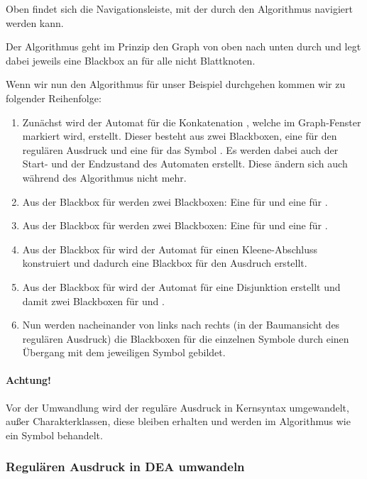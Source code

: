 Oben findet sich die Navigationsleiste, mit der durch den Algorithmus navigiert werden kann.

Der Algorithmus geht im Prinzip den Graph von oben nach unten durch und legt dabei jeweils eine Blackbox an für alle nicht Blattknoten. 

Wenn wir nun den Algorithmus für unser Beispiel durchgehen kommen wir zu folgender Reihenfolge:
\begin{enumerate}
  \item Zunächst wird der Automat für die Konkatenation , welche im Graph-Fenster markiert wird, erstellt. Dieser besteht aus zwei Blackboxen, eine für den regulären Ausdruck  und eine für das Symbol . Es werden dabei auch der Start- und der Endzustand des Automaten erstellt. Diese ändern sich auch während des Algorithmus nicht mehr.
  \item Aus der Blackbox für  werden zwei Blackboxen: Eine für  und eine für .
  \item Aus der Blackbox für  werden zwei Blackboxen: Eine für  und eine für .
  \item Aus der Blackbox für  wird der Automat für einen Kleene-Abschluss konstruiert und dadurch eine Blackbox für den Ausdruch  erstellt.
  \item Aus der Blackbox für  wird der Automat für eine Disjunktion erstellt und damit zwei Blackboxen für  und .
  \item Nun werden nacheinander von links nach rechts (in der Baumansicht des regulären Ausdruck) die Blackboxen für die einzelnen Symbole durch einen Übergang mit dem jeweiligen Symbol gebildet.
\end{enumerate}

\paragraph*{Achtung!} Vor der Umwandlung wird der reguläre Ausdruck in Kernsyntax umgewandelt, außer Charakterklassen, diese bleiben erhalten und werden im Algorithmus wie ein Symbol behandelt.

\subsubsection{Regulären Ausdruck in DEA umwandeln}

